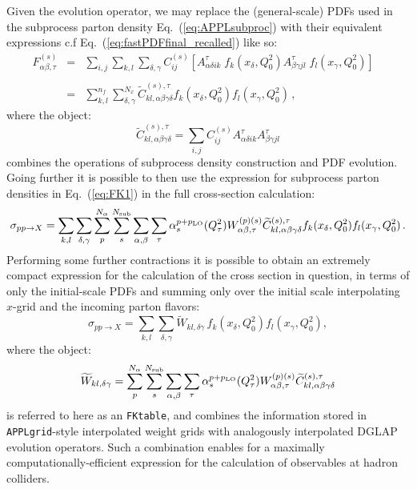 \documentclass[preprint,12pt]{elsarticle}
\begin{document}
Given the evolution operator, we may replace the (general-scale) PDFs
used in the subprocess parton density Eq.~(\ref{eq:APPLsubproc}) with
their equivalent expressions c.f Eq.~(\ref{eq:fastPDFfinal_recalled})
like so:
\begin{equation}\label{eq:FK1}
\begin{array}{rcl}
F^{(s)}_{\alpha\beta,\tau} &=&  \displaystyle \sum_{i,j} \sum_{k,l}
                               \sum_{\delta,\gamma} C^{(s)}_{ij}
                               \left[  A^\tau_{\alpha\delta ik}\;
                               f_k(x_\delta,Q^2_0) A^\tau_{\beta\gamma
                               jl}\; f_l(x_\gamma,Q^2_0) \right]\;\;\;
  \\
\\
&=& \displaystyle \sum_{k,l}^{n_f}\sum_{\delta,\gamma}^{N_x}
\widetilde{C}^{(s),\tau}_{kl,\alpha\beta\gamma\delta}
f_k(x_\delta,Q^2_0) f_l(x_\gamma,Q^2_0)\,,
\end{array}
\end{equation}
where the object:
\begin{equation}
  \widetilde{C}^{(s),\tau}_{kl,\alpha\beta\gamma\delta} =
  \sum_{i,j} C^{(s)}_{ij} A^\tau_{\alpha\delta ik}
  A^\tau_{\beta\gamma jl}
\end{equation}
combines the operations of subprocess density construction and PDF
evolution. Going further it is possible to then use the expression for
subprocess parton densities in Eq.~(\ref{eq:FK1}) in the full
cross-section calculation:
\begin{equation}
\sigma_{pp\to X} = \sum_{k,l}\sum_{\delta,\gamma}\sum_p^{N_\alpha}
\sum_{s}^{N_{\mathrm{sub}}} \sum_{\alpha,\beta}
\sum_{\tau} 
\alpha_s^{p+p_{\rm LO}}(Q^2_\tau)W_{\alpha\beta,\tau}^{(p)(s)} \widetilde{C}^{(s),\tau}_{kl,\alpha\beta\gamma\delta}
f_k(x_\delta,Q^2_0) f_l(x_\gamma,Q^2_0)\,.
\end{equation}
Performing some further contractions it is possible to obtain an
extremely compact expression for the calculation of the cross section
in question, in terms of only the initial-scale PDFs and summing only
over the initial scale interpolating $x$-grid and the incoming parton
flavors:
\begin{equation}\label{eq:FK}
  \sigma _{pp\to X} = \sum_{k,l}\sum_{\delta,\gamma} 
  \widetilde{W}_{kl,\delta\gamma} \,f_k(x_\delta,Q^2_0) f_l(x_\gamma,Q^2_0),
\end{equation}
where the object:
\begin{equation}\label{eq:FKTable}
  \widetilde{W}_{kl,\delta\gamma} = \sum_p^{N_\alpha} \sum_{s}^{N_{\mathrm{sub}}} \sum_{\alpha,\beta} \sum_{\tau}
\alpha_s^{p+p_{\rm LO}}(Q^2_\tau)  W_{\alpha\beta,\tau}^{(p)(s)} \widetilde{C}^{(s),\tau}_{kl,\alpha\beta\gamma\delta}
\end{equation}
is referred to here as an {\tt FKtable}, and combines the information
stored in {\tt APPLgrid}-style interpolated weight grids with
analogously interpolated DGLAP evolution operators. Such a combination
enables for a maximally computationally-efficient expression for the
calculation of observables at hadron colliders.
\end{document}
